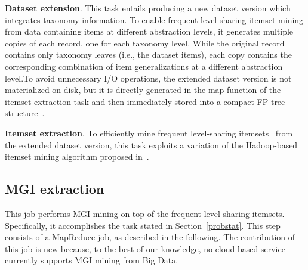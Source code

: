 \noindent \textbf{Dataset extension}. This task entails producing a new dataset version which integrates taxonomy information. 
To enable frequent level-sharing itemset mining from data containing items at different abstraction levels, it generates multiple copies of each record, one for each taxonomy level. 
While the original record contains only taxonomy leaves (i.e., the dataset items), each copy contains the corresponding combination of item generalizations at a different abstraction level.To avoid unnecessary I/O operations, the extended dataset version is not materialized on disk, but it is directly 
generated in the map function of the itemset extraction task and then immediately stored into a compact FP-tree structure~\cite{KumarBook}.

\noindent \textbf{Itemset extraction}. To efficiently mine frequent level-sharing itemsets~\cite{Han1999} from the extended dataset version, 
this task exploits a variation of the Hadoop-based itemset mining algorithm proposed in~\cite{ISPA13}. 


\subsection{MGI extraction}
\label{rulext}

This job performs MGI mining on top of the frequent level-sharing itemsets. 
Specifically, it accomplishes the task stated in Section~\ref{probstat}. 
This step consists of a MapReduce job, as described in the following.
The contribution of this job is new because, to the best of our knowledge, no cloud-based service currently supports MGI mining from Big Data.

